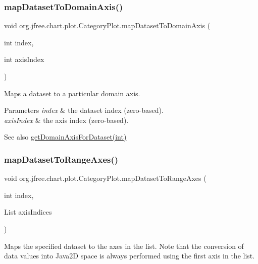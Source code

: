 \subsubsection{\texorpdfstring{map\+Dataset\+To\+Domain\+Axis()}{mapDatasetToDomainAxis()}}
{\footnotesize\ttfamily void org.\+jfree.\+chart.\+plot.\+Category\+Plot.\+map\+Dataset\+To\+Domain\+Axis (\begin{DoxyParamCaption}\item[{int}]{index,  }\item[{int}]{axis\+Index }\end{DoxyParamCaption})}

Maps a dataset to a particular domain axis.


\begin{DoxyParams}{Parameters}
{\em index} & the dataset index (zero-\/based). \\
\hline
{\em axis\+Index} & the axis index (zero-\/based).\\
\hline
\end{DoxyParams}
\begin{DoxySeeAlso}{See also}
\mbox{\hyperlink{classorg_1_1jfree_1_1chart_1_1plot_1_1_category_plot_a4867d8ae8d451d59732abf6bcfce58ee}{get\+Domain\+Axis\+For\+Dataset(int)}} 
\end{DoxySeeAlso}
\mbox{\label{classorg_1_1jfree_1_1chart_1_1plot_1_1_category_plot_a313f9a39fc7b91d05be08023fbad177c}} 
\subsubsection{\texorpdfstring{map\+Dataset\+To\+Range\+Axes()}{mapDatasetToRangeAxes()}}
{\footnotesize\ttfamily void org.\+jfree.\+chart.\+plot.\+Category\+Plot.\+map\+Dataset\+To\+Range\+Axes (\begin{DoxyParamCaption}\item[{int}]{index,  }\item[{List}]{axis\+Indices }\end{DoxyParamCaption})}

Maps the specified dataset to the axes in the list. Note that the conversion of data values into Java2D space is always performed using the first axis in the list.



